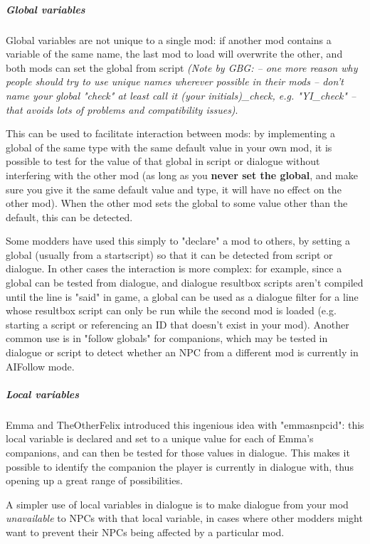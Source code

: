 \hypertarget{global-variables-1}{%
\subparagraph{Global variables}\label{global-variables-1}}

Global variables are not unique to a single mod: if another mod contains
a variable of the same name, the last mod to load will overwrite the
other, and both mods can set the global from script \emph{(Note by GBG:
-- one more reason why people should try to use unique names wherever
possible in their mods -- don't name your global "check" at least call
it (your initials)\_check, e.g. "YI\_check" -- that avoids lots of
problems and compatibility issues)}.

This can be used to facilitate interaction between mods: by implementing
a global of the same type with the same default value in your own mod,
it is possible to test for the value of that global in script or
dialogue without interfering with the other mod (as long as you
\textbf{never set the global}, and make sure you give it the same
default value and type, it will have no effect on the other mod). When
the other mod sets the global to some value other than the default, this
can be detected.

Some modders have used this simply to "declare" a mod to others, by
setting a global (usually from a startscript) so that it can be detected
from script or dialogue. In other cases the interaction is more complex:
for example, since a global can be tested from dialogue, and dialogue
resultbox scripts aren't compiled until the line is "said" in game, a
global can be used as a dialogue filter for a line whose resultbox
script can only be run while the second mod is loaded (e.g. starting a
script or referencing an ID that doesn't exist in your mod). Another
common use is in "follow globals" for companions, which may be tested in
dialogue or script to detect whether an NPC from a different mod is
currently in AIFollow mode.

\hypertarget{local-variables-1}{%
\subparagraph{Local variables}\label{local-variables-1}}

Emma and TheOtherFelix introduced this ingenious idea with "emmasnpcid":
this local variable is declared and set to a unique value for each of
Emma's companions, and can then be tested for those values in dialogue.
This makes it possible to identify the companion the player is currently
in dialogue with, thus opening up a great range of possibilities.

A simpler use of local variables in dialogue is to make dialogue from
your mod \emph{unavailable} to NPCs with that local variable, in cases
where other modders might want to prevent their NPCs being affected by a
particular mod.

